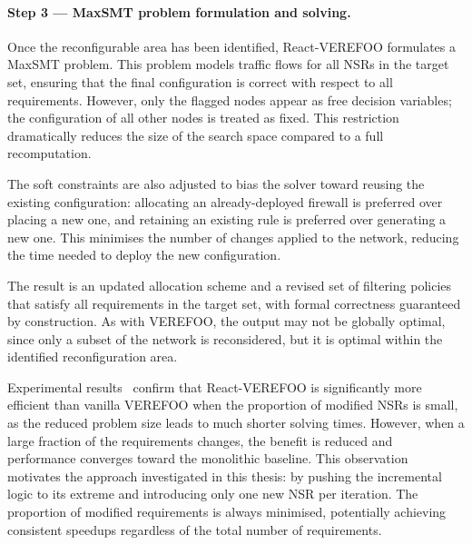 \paragraph{Step 3 — MaxSMT problem formulation and solving.} Once the reconfigurable area has been identified, React-VEREFOO formulates a MaxSMT problem. This problem models traffic flows for all NSRs in the target set, ensuring that the final configuration is correct with respect to all requirements. However, only the flagged nodes appear as free decision variables; the configuration of all other nodes is treated as fixed. This restriction dramatically reduces the size of the search space compared to a full recomputation. 

The soft constraints are also adjusted to bias the solver toward reusing the existing configuration: allocating an already-deployed firewall is preferred over placing a new one, and retaining an existing rule is preferred over generating a new one. This minimises the number of changes applied to the network, reducing the time needed to deploy the new configuration.

The result is an updated allocation scheme and a revised set of filtering policies that satisfy all requirements in the target set, with formal correctness guaranteed by construction. As with VEREFOO, the output may not be globally optimal, since only a subset of the network is reconsidered, but it is optimal within the identified reconfiguration area.


Experimental results~\cite{reactverefoo} confirm that React-VEREFOO is significantly more efficient than vanilla VEREFOO when the proportion of modified NSRs is small, as the reduced problem size leads to much shorter solving times. However, when a large fraction of the requirements changes, the benefit is reduced and performance converges toward the monolithic baseline. This observation motivates the approach investigated in this thesis: by pushing the incremental logic to its extreme and introducing only one new NSR per iteration. The proportion of modified requirements is always minimised, potentially achieving consistent speedups regardless of the total number of requirements.
